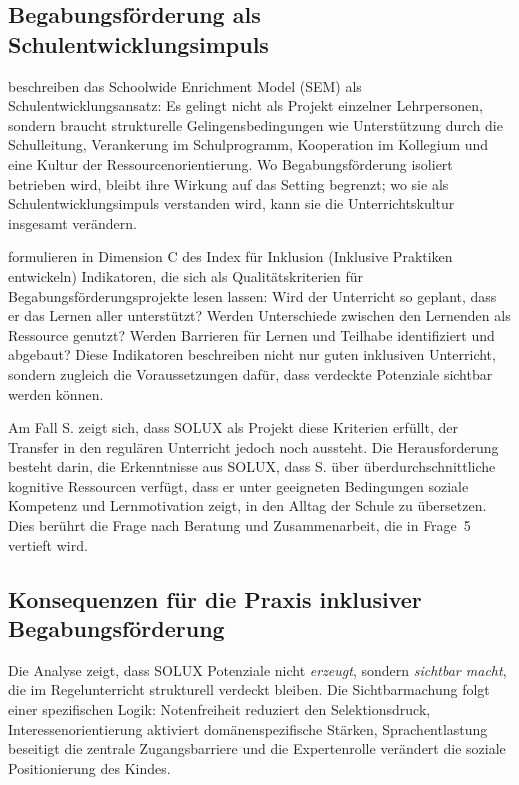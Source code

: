 \documentclass[ngerman, a4paper]{article}
\begin{document}
\subsection{Begabungsförderung als Schulentwicklungsimpuls}

\textcite[S.\,444--454]{renzullireis2021rls} beschreiben das
Schoolwide Enrichment Model (SEM) als Schulentwicklungsansatz: Es gelingt
nicht als Projekt einzelner Lehrpersonen, sondern braucht strukturelle
Gelingensbedingungen wie Unterstützung durch die Schulleitung, Verankerung
im Schulprogramm, Kooperation im Kollegium und eine Kultur der
Ressourcenorientierung. Wo Begabungsförderung isoliert betrieben wird,
bleibt ihre Wirkung auf das Setting begrenzt; wo sie als
Schulentwicklungsimpuls verstanden wird, kann sie die Unterrichtskultur
insgesamt verändern.

\textcite[Dim.\,C]{booth2019index} formulieren in Dimension C des Index für Inklusion (Inklusive
Praktiken entwickeln) Indikatoren, die sich als Qualitätskriterien für
Begabungsförderungsprojekte lesen lassen: Wird der Unterricht so geplant, dass er
das Lernen aller unterstützt? Werden Unterschiede zwischen den Lernenden als
Ressource genutzt? Werden Barrieren für Lernen und Teilhabe identifiziert und
abgebaut? Diese Indikatoren beschreiben nicht nur guten inklusiven Unterricht,
sondern zugleich die Voraussetzungen dafür, dass verdeckte Potenziale sichtbar
werden können.

Am Fall S. zeigt sich, dass SOLUX als Projekt diese Kriterien erfüllt, der Transfer
in den regulären Unterricht jedoch noch aussteht. Die Herausforderung besteht darin,
die Erkenntnisse aus SOLUX, dass S. über überdurchschnittliche kognitive Ressourcen
verfügt, dass er unter geeigneten Bedingungen soziale Kompetenz und Lernmotivation
zeigt, in den Alltag der Schule zu übersetzen. Dies berührt die Frage nach
Beratung und Zusammenarbeit, die in Frage~5 vertieft wird.

\subsection{Konsequenzen für die Praxis inklusiver Begabungsförderung}

Die Analyse zeigt, dass SOLUX Potenziale nicht \textit{erzeugt}, sondern
\textit{sichtbar macht}, die im Regelunterricht strukturell verdeckt bleiben. Die
Sichtbarmachung folgt einer spezifischen Logik: Notenfreiheit reduziert den
Selektionsdruck, Interessenorientierung aktiviert domänenspezifische Stärken,
Sprachentlastung beseitigt die zentrale Zugangsbarriere und die Expertenrolle
verändert die soziale Positionierung des Kindes.
\end{document}
